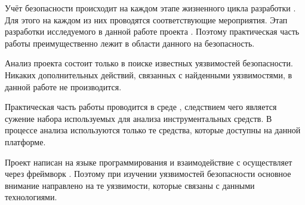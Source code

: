 %
Учёт безопасности происходит на каждом этапе жизненного цикла разработки 
 . 
%
Для этого на каждом из них проводятся соответствующие мероприятия. 
%
Этап разработки исследуемого в данной работе проекта   
. 
%
Поэтому практическая часть работы преимущественно лежит в области  данного 
 на безопасность.

%
Анализ проекта  состоит только в поиске известных уязвимостей безопасности.
%
Никаких дополнительных действий, связанных с найденными уязвимостями, в данной работе не производится.

%
Практическая часть работы проводится в среде  , следствием чего является сужение набора используемых для анализа инструментальных средств.
%
В процессе анализа используются только те средства, которые доступны на данной платформе.

%
Проект  написан на языке программирования   и взаимодействие 
с  осуществляет через фреймворк  .
%
Поэтому при изучении уязвимостей безопасности  основное внимание направлено на те уязвимости, которые связаны с данными технологиями.
